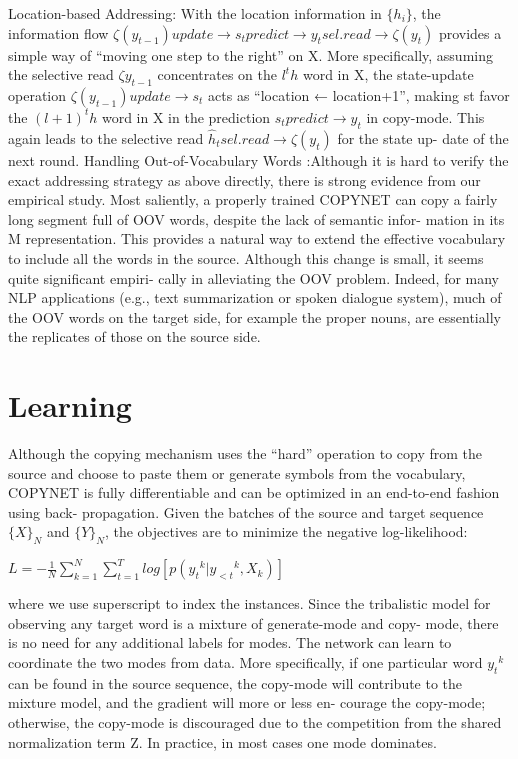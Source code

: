 \documentclass[UTF8]{ctexart}
\begin{document}
    Location-based Addressing: With the location
information in $\{h_i\}$, the information flow
 $\zeta(y_{t−1}) update → s_t  predict → y_t sel.read→ \zeta (y_t)$
provides a simple way of “moving one step to the
right” on X. More specifically, assuming the selective read 
$\zeta{y_{t−1}}$ concentrates on the $l^th$ word
in X, the state-update operation $ \zeta(y_{t−1}) update →s_t$
acts as “location ← location+1”, making st
favor the $(l+1)^th$ word in X in the prediction
$s_t predict → y_t $ in copy-mode. This again leads to
the selective read $\hat{h}_t sel. read →\zeta(y_t)$ for the state up-
date of the next round.
Handling Out-of-Vocabulary Words :Although
it is hard to verify the exact addressing strategy as
above directly, there is strong evidence from our
empirical study. Most saliently, a properly trained
COPYNET can copy a fairly long segment full of
OOV words, despite the lack of semantic infor-
mation in its M representation. This provides a
natural way to extend the effective vocabulary to
include all the words in the source. Although this
change is small, it seems quite significant empiri-
cally in alleviating the OOV problem. Indeed, for
many NLP applications (e.g., text summarization
or spoken dialogue system), much of the OOV
words on the target side, for example the proper
nouns, are essentially the replicates of those on the
source side.

    \section{Learning}
    Although the copying mechanism uses the “hard”
    operation to copy from the source and choose to
    paste them or generate symbols from the vocabulary, COPYNET is fully differentiable and can
    be optimized in an end-to-end fashion using back-
    propagation. Given the batches of the source and
    target sequence $\{X\}_N$ and $\{Y\}_N$, the objectives
    are to minimize the negative log-likelihood:

    $    L=-\frac{1}{N}\sum_{k=1}^{N}\sum_{t=1}^{T}log[p({y_t}^k|{y_{<t}}^k,X_k)]                             $


    where we use superscript to index the instances.
    Since the tribalistic model for observing any target word is a mixture of generate-mode and copy-
    mode, there is no need for any additional labels
    for modes. The network can learn to coordinate
    the two modes from data. More specifically, if one
    particular word ${y_t}^k$ can be found in the source sequence, the copy-mode will contribute to the mixture model, and the gradient will more or less en-
    courage the copy-mode; otherwise, the copy-mode
    is discouraged due to the competition from the
    shared normalization term Z. In practice, in most
    cases one mode dominates.
\end{document}

